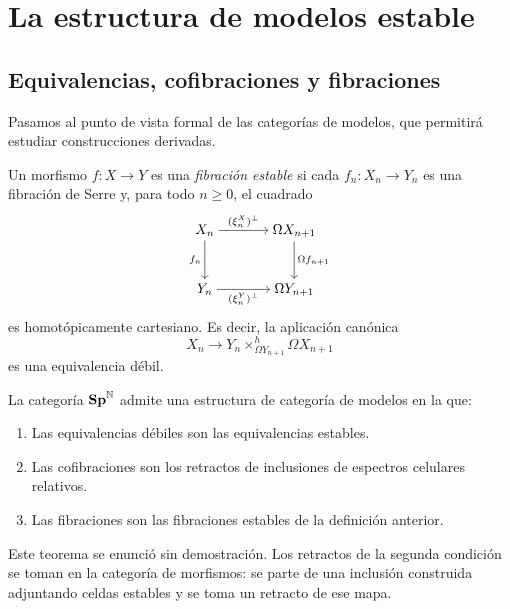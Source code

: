 \section{La estructura de modelos estable}

\subsection{Equivalencias, cofibraciones y fibraciones}

Pasamos al punto de vista formal de las categorías de modelos, que permitirá estudiar construcciones derivadas.

\begin{defi}\label{defi:c13-fibracion-estable}
Un morfismo $f\colon X\to Y$ es una \emph{fibración estable} si cada $f_n\colon X_n\to Y_n$ es una fibración de Serre y, para todo $n\ge0$, el cuadrado
\[
\begin{tikzcd}[cramped,column sep=large,row sep=large]
X_n \arrow[r,"(\xi^X_n)^\perp"] \arrow[d,"f_n"']
& \Omega X_{n+1} \arrow[d,"\Omega f_{n+1}"]\\
Y_n \arrow[r,"(\xi^Y_n)^\perp"'] & \Omega Y_{n+1}
\end{tikzcd}
\]
es homotópicamente cartesiano. Es decir, la aplicación canónica
\[
X_n\longrightarrow Y_n\mathop{\times}^{h}_{\Omega Y_{n+1}}\Omega X_{n+1}
\]
es una equivalencia débil.
\end{defi}

\begin{teo}\label{teo:c13-modelos-estables}
La categoría $\mathbf{Sp}^{\mathbb N}$ admite una estructura de categoría de modelos en la que:
\begin{enumerate}
\item Las equivalencias débiles son las equivalencias estables.
\item Las cofibraciones son los retractos de inclusiones de espectros celulares relativos.
\item Las fibraciones son las fibraciones estables de la definición anterior.
\end{enumerate}
\end{teo}
Este teorema se enunció sin demostración. Los retractos de la segunda condición se toman en la categoría de morfismos: se parte de una inclusión construida adjuntando celdas estables y se toma un retracto de ese mapa.

